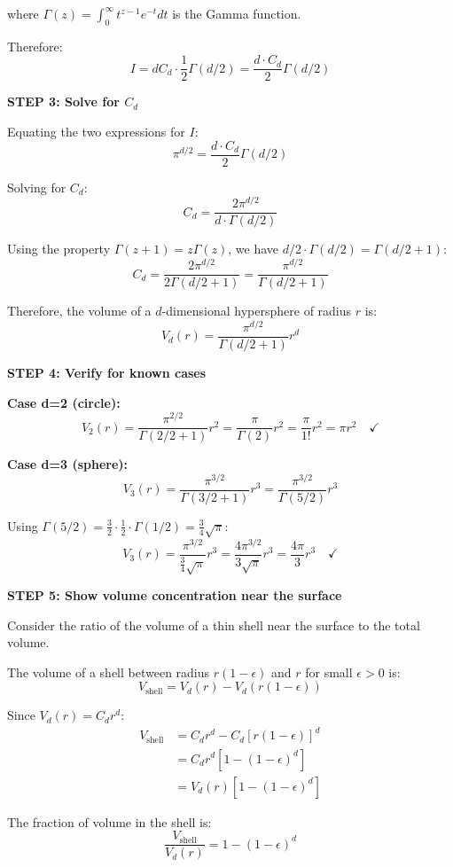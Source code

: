 \documentclass[12pt]{article}
\begin{document}
\begin{solution}
where \(\Gamma(z) = \int_0^{\infty} t^{z-1} e^{-t} dt\) is the Gamma function.

Therefore:
\[
I = d C_d \cdot \frac{1}{2} \Gamma(d/2) = \frac{d \cdot C_d}{2} \Gamma(d/2)
\]

\textbf{STEP 3: Solve for \(C_d\)}

Equating the two expressions for \(I\):
\[
\pi^{d/2} = \frac{d \cdot C_d}{2} \Gamma(d/2)
\]

Solving for \(C_d\):
\[
C_d = \frac{2\pi^{d/2}}{d \cdot \Gamma(d/2)}
\]

Using the property \(\Gamma(z+1) = z \Gamma(z)\), we have \(d/2 \cdot \Gamma(d/2) = \Gamma(d/2 + 1)\):
\[
C_d = \frac{2\pi^{d/2}}{2 \Gamma(d/2 + 1)} = \frac{\pi^{d/2}}{\Gamma(d/2 + 1)}
\]

Therefore, the volume of a \(d\)-dimensional hypersphere of radius \(r\) is:
\[
\boxed{V_d(r) = \frac{\pi^{d/2}}{\Gamma(d/2 + 1)} r^d}
\]

\textbf{STEP 4: Verify for known cases}

\textbf{Case d=2 (circle):}
\[
V_2(r) = \frac{\pi^{2/2}}{\Gamma(2/2 + 1)} r^2 = \frac{\pi}{\Gamma(2)} r^2 = \frac{\pi}{1!} r^2 = \pi r^2 \quad \checkmark
\]

\textbf{Case d=3 (sphere):}
\[
V_3(r) = \frac{\pi^{3/2}}{\Gamma(3/2 + 1)} r^3 = \frac{\pi^{3/2}}{\Gamma(5/2)} r^3
\]

Using \(\Gamma(5/2) = \frac{3}{2} \cdot \frac{1}{2} \cdot \Gamma(1/2) = \frac{3}{4}\sqrt{\pi}\):
\[
V_3(r) = \frac{\pi^{3/2}}{\frac{3}{4}\sqrt{\pi}} r^3 = \frac{4\pi^{3/2}}{3\sqrt{\pi}} r^3 = \frac{4\pi}{3} r^3 \quad \checkmark
\]

\textbf{STEP 5: Show volume concentration near the surface}

Consider the ratio of the volume of a thin shell near the surface to the total volume.

The volume of a shell between radius \(r(1-\epsilon)\) and \(r\) for small \(\epsilon > 0\) is:
\[
V_{\text{shell}} = V_d(r) - V_d(r(1-\epsilon))
\]

Since \(V_d(r) = C_d r^d\):
\begin{align*}
V_{\text{shell}} &= C_d r^d - C_d [r(1-\epsilon)]^d \\
&= C_d r^d [1 - (1-\epsilon)^d] \\
&= V_d(r) [1 - (1-\epsilon)^d]
\end{align*}

The fraction of volume in the shell is:
\[
\frac{V_{\text{shell}}}{V_d(r)} = 1 - (1-\epsilon)^d
\]


\end{solution}
\end{document}
